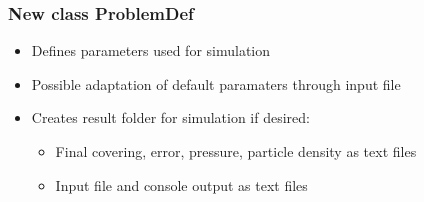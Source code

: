 \subsubsection{New class ProblemDef}
\begin{itemize}[noitemsep,topsep=0pt, partopsep=0pt]
\item Defines parameters used for simulation
\item Possible adaptation of default paramaters through input file
\item Creates result folder for simulation if desired:
	\begin{itemize}[noitemsep,topsep=0pt, partopsep=0pt]
	\item Final covering, error, pressure, particle density as text files
	\item Input file and console output as text files
	\end{itemize}
\end{itemize}

